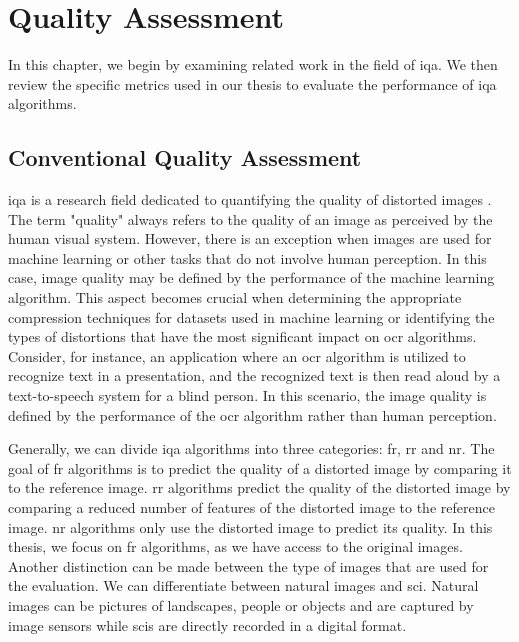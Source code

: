 \chapter{Quality Assessment}
\label{chap:qualityassessment}

In this chapter, we begin by examining related work in the field of \gls{iqa}.
We then review the specific metrics used in our thesis to evaluate the performance of \gls{iqa} algorithms.

\section{Conventional Quality Assessment}

\Gls{iqa} is a research field dedicated to quantifying the quality of distorted images \cite{iqa_survey_2020}.
The term "quality" always refers to the quality of an image as perceived by the human visual system.
However, there is an exception when images are used for machine learning or other tasks that do not involve human perception.
In this case, image quality may be defined by the performance of the machine learning algorithm.
This aspect becomes crucial when determining the appropriate compression techniques for datasets used in machine learning or identifying the types of distortions that have the most significant impact on \gls{ocr} algorithms.
Consider, for instance, an application where an \gls{ocr} algorithm is utilized to recognize text in a presentation, and the recognized text is then read aloud by a text-to-speech system for a blind person.
In this scenario, the image quality is defined by the performance of the \gls{ocr} algorithm rather than human perception.

Generally, we can divide \gls{iqa} algorithms into three categories: \gls{fr}, \gls{rr} and \gls{nr}.
The goal of \gls{fr} algorithms is to predict the quality of a distorted image by comparing it to the reference image.
\Gls{rr} algorithms predict the quality of the distorted image by comparing a reduced number of features of the distorted image to the reference image.
\Gls{nr} algorithms only use the distorted image to predict its quality.
In this thesis, we focus on \gls{fr} algorithms, as we have access to the original images.
Another distinction can be made between the type of images that are used for the evaluation.
We can differentiate between natural images and \gls{sci}.
Natural images can be pictures of landscapes, people or objects and are captured by image sensors while \glspl{sci} are directly recorded in a digital format.


